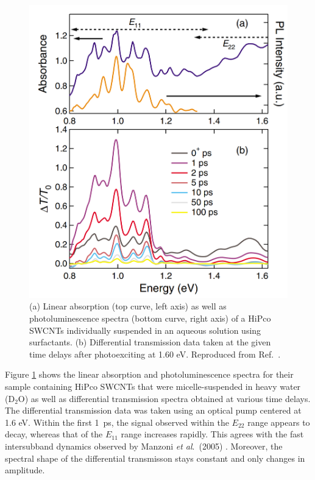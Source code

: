 \begin{figure}[ht]
	\centering
	\includegraphics[scale=0.22]{images/chapter_prior_works/abs_dtt_gordana_2005}
	\caption{(a) Linear absorption (top curve, left axis) as well as photoluminescence spectra (bottom curve, right axis) of a  HiPco SWCNTs individually suspended in an aqueous solution using surfactants. (b) Differential transmission data taken at the given time delays after photoexciting at 1.60 eV. Reproduced from Ref.\ \cite{ostojic2005stability}. }
	\label{fig:abs_dtt_gordana_2005}
\end{figure}

Figure \ref{fig:abs_dtt_gordana_2005} shows the linear absorption and photoluminescence spectra for their sample containing HiPco SWCNTs that were micelle-suspended in heavy water (D$_2$O) as well as differential transmission spectra obtained at various time delays. The differential transmission data was taken using an optical pump centered at 1.6 eV. Within the first \SI{1}{\pico\second}, the signal observed within the $E_{22}$ range appears to decay, whereas that of the $E_{11}$ range increases rapidly. This agrees with the fast intersubband dynamics observed by Manzoni \textit{et al}.\ (2005) \cite{manzoni2005intersubband}. Moreover, the spectral shape of the differential transmisson stays constant and only changes in amplitude.


